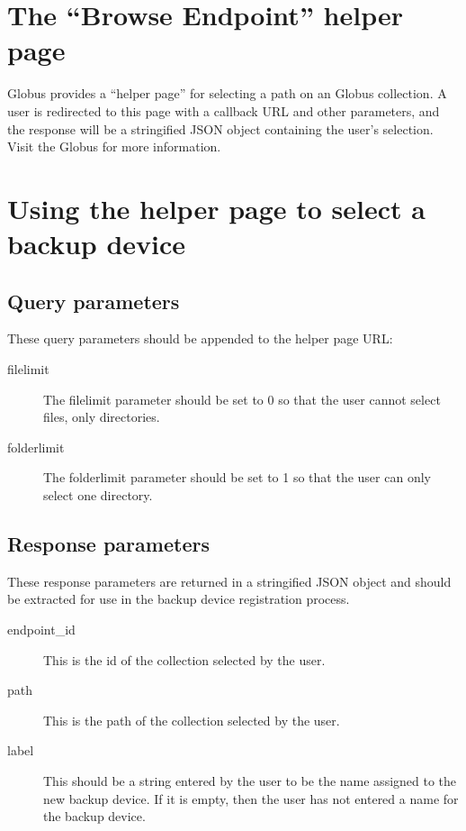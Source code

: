 
\section{The ``Browse Endpoint'' helper page}

Globus provides a ``helper page'' for selecting a path on an Globus collection.
A user is redirected to this page with a callback URL and other parameters, and
the response will be a stringified JSON object containing the user's selection.
Visit the Globus  for more information.

\section{Using the helper page to select a backup device}

\subsection{Query parameters}

These query parameters should be appended to the helper page URL:
\begin{description}
    \item[filelimit] The filelimit parameter should be set to 0 so that the user
    cannot select files, only directories.
    \item[folderlimit] The folderlimit parameter should be set to 1 so that the 
    user can only select one directory.
\end{description}

\subsection{Response parameters}

These response parameters are returned in a stringified JSON object and should
be extracted for use in the backup device registration process.

\begin{description}
    \item[endpoint\_id] This is the id of the collection selected by the user.
    \item[path] This is the path of the collection selected by the user.
    \item[label] This should be a string entered by the user to be the name
    assigned to the new backup device. If it is empty, then the user has not
    entered a name for the backup device.
\end{description}
